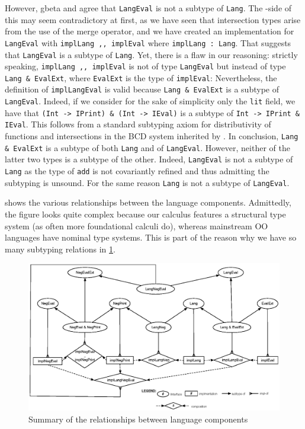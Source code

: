 However, gbeta and \namee agree that \lstinline{LangEval} is not a subtype of
\lstinline{Lang}. The \namee-side of this may seem contradictory at first, as we
have seen that intersection types arise from the use of the merge operator, and
we have created an implementation for \lstinline{LangEval} with
\lstinline{implLang ,, implEval} where \lstinline{implLang : Lang}. That
suggests that \lstinline{LangEval} is a subtype of \lstinline{Lang}.
Yet, there is a flaw in our reasoning:
strictly speaking, \lstinline{implLang ,, implEval} is not of
type \lstinline{LangEval} but instead of type \lstinline{Lang & EvalExt}, where
\lstinline{EvalExt} is the type of \lstinline{implEval}:
Nevertheless, the definition of \lstinline{implLangEval} is valid because
\lstinline{Lang & EvalExt} is a subtype of \lstinline{LangEval}.
Indeed, if we consider for the sake of simplicity only the \lstinline{lit}
field, we have that \lstinline{(Int -> IPrint) & (Int -> IEval)} is a
subtype of \lstinline{Int -> IPrint & IEval}. This follows from a standard
subtyping axiom for distributivity of functions and intersections in the BCD system inherited by \namee.
In conclusion, \lstinline{Lang & EvalExt} is a subtype of both \lstinline{Lang}
and of \lstinline{LangEval}. However, neither of the latter two types is a subtype of the other.
Indeed, \lstinline{LangEval} is not a subtype of \lstinline{Lang} as the type
of \lstinline{add} is not covariantly refined and thus admitting the subtyping
is unsound. For the same reason \lstinline{Lang} is not a subtype of \lstinline{LangEval}.


 shows the various relationships between the language
components. Admittedly, the figure looks quite complex because our calculus
features a structural type system (as often more foundational calculi do),
whereas mainstream OO languages have nominal type systems. This is part of the
reason why we have so many subtyping relations in \cref{fig:diagram}.

\begin{figure}[t]
  \centering
\includegraphics[scale=0.75]{diagram.eps}
\caption{Summary of the relationships between language components}
\label{fig:diagram}
\end{figure}



